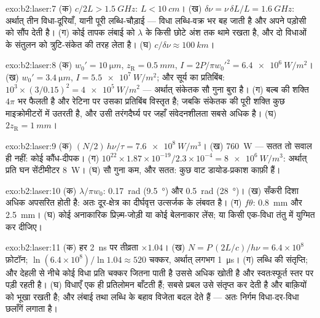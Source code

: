 \begin{solution}{exo:b2:laser:7}
(क) $c/2L > \qty{1.5}{GHz}$: $L < \qty{10}{cm}$। (ख) $\delta\nu = \nu\,\delta L/L
= \qty{1.6}{GHz}$: अर्थात् तीन विधा-दूरियाँ, यानी पूरी लब्धि-चौड़ाई --- विधा
लब्धि-वक्र भर बह जाती है और अपने पड़ोसी को सौंप देती है। (ग) कोई
तापक लंबाई को $\lambda$ के किसी छोटे अंश तक थामे रखता है, और दो विधाओं के
संतुलन को त्रुटि-संकेत की तरह लेता है। (घ) $c/\delta\nu \approx
\qty{100}{km}$।
\end{solution}

\begin{solution}{exo:b2:laser:8}
(क) $w_0' = \qty{10}{\micro m}$, $z_{\text{R}} = \qty{0.5}{mm}$, $I = 2P/\pi
w_0'^2 = \qty{6.4e6}{W/m^2}$। (ख) $w_0' = \qty{3.4}{\micro m}$, $I =
\qty{5.5e7}{W/m^2}$; और सूर्य का प्रतिबिंब: $10^3 \times (3/0.15)^2 =
\qty{4e5}{W/m^2}$ --- अर्थात् संकेतक सौ गुना बुरा है। (ग) बल्ब की
शक्ति $4\pi$ भर फैलती है और रेटिना पर उसका प्रतिबिंब विस्तृत है; जबकि
संकेतक की पूरी शक्ति कुछ माइक्रोमीटरों में उतरती है, और उसी तरंगदैर्घ्य
पर जहाँ संवेदनशीलता सबसे अधिक है। (घ) $2z_{\text{R}} = \qty{1}{mm}$।
\end{solution}

\begin{solution}{exo:b2:laser:9}
(क) $(N/2)\,h\nu/\tau = \qty{7.6e8}{W/m^3}$। (ख) \qty{760}{W} --- सतत
तो सवाल ही नहीं: कोई कौंध-दीपक। (ग) $10^{22} \times 1.87 \times
10^{-19}/2.3 \times 10^{-4} = \qty{8e6}{W/m^3}$: अर्थात् प्रति घन
सेंटीमीटर \qty{8}{W}। (घ) सौ गुना कम, और सतत: कुछ वाट
डायोड-प्रकाश काफ़ी हैं।
\end{solution}

\begin{solution}{exo:b2:laser:10}
(क) $\lambda/\pi w_0$: \qty{0.17}{rad} (\qty{9.5}{\degree}) और \qty{0.5}{rad}
(\qty{28}{\degree})। (ख) सँकरी दिशा अधिक अपसरित होती है: अतः
दूर-क्षेत्र का दीर्घवृत्त उत्सर्जक के लंबवत है। (ग) $f\theta$:
\qty{0.8}{mm} और \qty{2.5}{mm}। (घ) कोई अनाकारिक प्रिज़्म-जोड़ी या कोई
बेलनाकार लेंस; या किसी एक-विधा तंतु में युग्मित कर दीजिए।
\end{solution}

\begin{solution}{exo:b2:laser:11}
(क) हर \qty{2}{ns} पर तीव्रता $\times 1.04$। (ख) $N = P\,(2L/c)/h\nu =
6.4 \times 10^8$ फ़ोटॉन; $\ln(6.4 \times 10^8)/\ln 1.04 \approx 520$ चक्कर,
अर्थात् लगभग \qty{1}{\micro s}। (ग) लब्धि की संतृप्ति; और देहली से नीचे कोई विधा
प्रति चक्कर जितना पाती है उससे अधिक खोती है और स्वतःस्फूर्त स्तर पर
पड़ी रहती है। (घ) विधाएँ एक ही प्रतिलोमन बाँटती हैं; सबसे प्रबल उसे
संतृप्त कर देती है और बाक़ियों को भूखा रखती है; और लंबाई तथा लब्धि के बहाव
विजेता बदल देते हैं --- अतः निर्गम विधा-दर-विधा छलाँगें लगाता है।
\end{solution}

